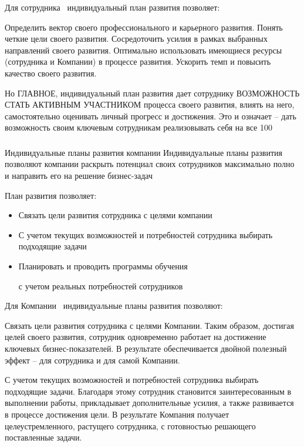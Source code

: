 \documentclass{../industrial-development}
\begin{document}
\lecturenotes

Для сотрудника~\cite{IPl} индивидуальный план развития позволяет:

          Определить вектор своего профессионального и карьерного развития. Понять четкие цели своего развития. 
	Сосредоточить усилия в рамках выбранных направлений своего развития. 
	Оптимально использовать имеющиеся ресурсы (сотрудника и Компании) в процессе развития. 
	Ускорить темп и повысить качество своего развития. 

Но ГЛАВНОЕ, индивидуальный план развития дает сотруднику ВОЗМОЖНОСТЬ СТАТЬ АКТИВНЫМ УЧАСТНИКОМ процесса своего развития, влиять на него, самостоятельно оценивать личный прогресс и достижения. Это и означает – дать возможность своим ключевым сотрудникам реализовывать себя на все 100%


\begin{frame} \frametitle{}
  \begin{block}{Индивидуальные планы развития компании}
Индивидуальные планы развития позволяют компании раскрыть потенциал своих сотрудников максимально полно и направить его на решение бизнес-задач
  \end{block}

  \bigskip
  План развития позволяет:
   \begin{itemize}
  \item Связать цели развития сотрудника с целями компании
  \item С учетом текущих возможностей и потребностей сотрудника выбирать подходящие задачи
  \item	Планировать и проводить программы обучения 

с учетом реальных потребностей сотрудников 
  \end{itemize}
\end{frame}

\lecturenotes

Для Компании~\cite{IPl} индивидуальные планы развития позволяют:

	Связать цели развития сотрудника с целями Компании. Таким образом, достигая целей своего развития, сотрудник одновременно работает на достижение ключевых бизнес-показателей. В результате обеспечивается двойной полезный эффект – для сотрудника и для самой Компании.

	С учетом текущих возможностей и потребностей сотрудника выбирать подходящие задачи. Благодаря этому сотрудник становится заинтересованным в выполнении работы, прикладывает дополнительные усилия, а также развивается в процессе достижения цели. В результате Компания получает целеустремленного, растущего сотрудника, с готовностью решающего поставленные задачи.
\end{document}

